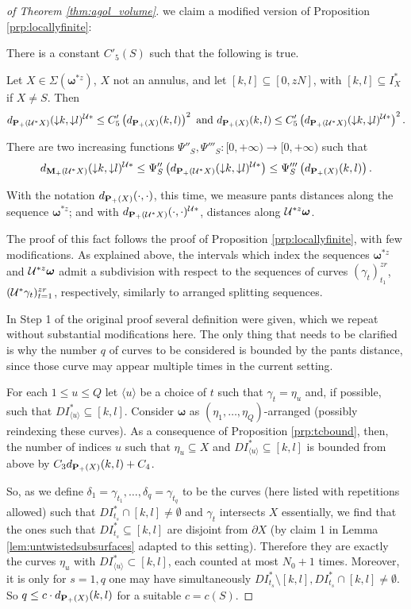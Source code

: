 \begin{proof}[of Theorem \ref{thm:agol_volume}]
 we claim a modified version of Proposition \ref{prp:locallyfinite}:
\begin{claim}
There is a constant $C'_5(S)$ such that the following is true.

Let $X\in \Sigma(\bm\omega^{*z})$, $X$ not an annulus, and let $[k,l]\subseteq [0,zN]$, with $[k,l]\subseteq I^*_X$ if $X\not=S$. Then
$$
d_{{\mathbf{P}_+}({\mathcal U}^* X)}(\mathord{\downarrow} k,\mathord{\downarrow} l)^{{\mathcal U}*} \leq C'_5 \left(d_{{\mathbf{P}_+}(X)}(k,l)\right)^2
\text{ and }
d_{{\mathbf{P}_+}(X)}(k,l) \leq C'_5 \left(d_{{\mathbf{P}_+}({\mathcal U}^* X)}(\mathord{\downarrow} k,\mathord{\downarrow} l)^{{\mathcal U}*}\right)^2.
$$

There are two increasing functions $\Psi''_S, \Psi'''_S:[0,+\infty)\rightarrow [0,+\infty)$ such that
$$
d_{{\mathbf{M}_+}({\mathcal U}^* X)}(\mathord{\downarrow} k,\mathord{\downarrow} l)^{{\mathcal U}*} \leq \Psi''_S\left(d_{{\mathbf{P}_+}({\mathcal U}^* X)}(\mathord{\downarrow} k,\mathord{\downarrow} l)^{{\mathcal U}*}\right) \leq \Psi'''_S\left( d_{{\mathbf{P}_+}(X)}(k,l) \right).
$$
\end{claim}

With the notation $d_{{\mathbf{P}_+}(X)}(\cdot,\cdot)$, this time, we measure pants distances along the sequence $\bm\omega^{*z}$; and with $d_{{\mathbf{P}_+}({\mathcal U}^* X)}(\cdot,\cdot)^{{\mathcal U}*}$, distances along ${\mathcal U}^{*z}\bm\omega$.

The proof of this fact follows the proof of Proposition \ref{prp:locallyfinite}, with few modifications. As explained above, the intervals which index the sequences $\bm\omega^{*z}$ and ${\mathcal U}^{*z}\bm\omega$ admit a subdivision with respect to the sequences of curves $(\gamma_t)_{t_1}^{zr}$, $({\mathcal U}^*\gamma_t)_{t=1}^{zr}$, respectively, similarly to arranged splitting sequences.

In Step 1 of the original proof several definition were given, which we repeat without substantial modifications here. The only thing that needs to be clarified is why the number $q$ of curves to be considered is bounded by the pants distance, since those curve may appear multiple times in the current setting.

For each $1\leq u\leq Q$ let $\langle u\rangle$ be a choice of $t$ such that $\gamma_t=\eta_u$ and, if possible, such that $DI^*_{\langle u\rangle}\subseteq [k,l]$. Consider $\bm\omega$ as $(\eta_1,\ldots,\eta_Q)$-arranged (possibly reindexing these curves). 
As a consequence of Proposition \ref{prp:tcbound}, then, the number of indices $u$ such that $\eta_u\subseteq X$ and $DI^*_{\langle u\rangle}\subseteq [k,l]$ is bounded from above by $C_3 d_{{\mathbf{P}_+}(X)}(k,l)+ C_4$.

So, as we define $\delta_1=\gamma_{t_1},\ldots,\delta_q=\gamma_{t_q}$ to be the curves (here listed with repetitions allowed) such that $DI^*_{t_s}\cap [k,l] \not=\emptyset$ and $\gamma_t$ intersects $X$ essentially, we find that the ones such that $DI^*_{t_s}\subseteq [k,l]$ are disjoint from $\partial X$ (by claim 1 in Lemma \ref{lem:untwistedsubsurfaces} adapted to this setting). Therefore they are exactly the curves $\eta_u$ with $DI^*_{\langle u\rangle}\subset[k,l]$, each counted at most $N_0+1$ times. Moreover, it is only for $s=1,q$ one may have simultaneously $DI^*_{t_s} \setminus [k,l], DI^*_{t_s}\cap [k,l]\not=\emptyset$. So $q\leq c \cdot d_{{\mathbf{P}_+}(X)}(k,l)$ for a suitable $c=c(S)$.


\end{proof}
